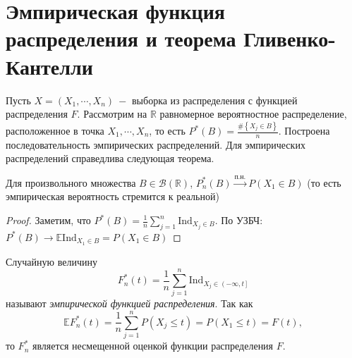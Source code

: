 \clearpage

\section{Эмпирическая функция распределения и теорема Гливенко-Кантелли}
Пусть $X = \left(X_1, \cdots, X_n\right) \ -$ выборка из распределения с функцией распределения $F$. Рассмотрим на $\mathbb{R}$ равномерное вероятностное распределение, расположенное в точка $X_1, \cdots, X_n$, то есть $P^*\left(B\right) = \frac{\#\left\{X_j \in B\right\}}{n}$. Построена последовательность эмпирических распределений. Для эмпирических распределений справедлива следующая теорема.

\begin{theorem}
Для произвольного множества $B \in \mathcal{B}\left(\mathbb{R}\right)$, $P_n^*\left(B\right) \xrightarrow{\text{п.н.}} P\left(X_1 \in B\right)$ (то есть эмпирическая вероятность стремится к реальной)
\end{theorem}
\begin{proof}
Заметим, что  $P^*\left(B\right) = \frac 1 n \sum_{j=1}^n \text{Ind}_{X_j \in B}$. По УЗБЧ: $P^*\left(B\right) \xrightarrow{} \mathbb{E} \text{Ind}_{X_1 \in B} = P\left(X_1 \in B\right)$
\end{proof}
\begin{definition}
Случайную величину 
\[
    F^*_n\left(t\right)= \frac 1 n \sum_{j=1}^n \text{Ind}_{X_j \in \left(-\infty, t\right]}
\]
называют \textit{эмпирической функцией распределения}. Так как
\[
    \mathbb{E} F^*_n\left(t\right) = \frac 1 n \sum_{j=1}^n P\left(X_j \leq t\right) = P\left(X_1 \leq t\right) = F\left(t\right),
\]
то $F_n^*$ является несмещенной оценкой функции распределения $F$.
\end{definition}

